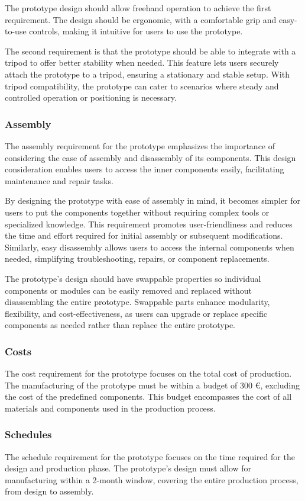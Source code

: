 The prototype design should allow freehand operation to achieve the first requirement. The design should be ergonomic, with a comfortable grip and easy-to-use controls, making it intuitive for users to use the prototype.

The second requirement is that the prototype should be able to integrate with a tripod to offer better stability when needed. This feature lets users securely attach the prototype to a tripod, ensuring a stationary and stable setup. With tripod compatibility, the prototype can cater to scenarios where steady and controlled operation or positioning is necessary.

\subsubsection{Assembly}
The assembly requirement for the prototype emphasizes the importance of considering the ease of assembly and disassembly of its components. This design consideration enables users to access the inner components easily, facilitating maintenance and repair tasks.

By designing the prototype with ease of assembly in mind, it becomes simpler for users to put the components together without requiring complex tools or specialized knowledge. This requirement promotes user-friendliness and reduces the time and effort required for initial assembly or subsequent modifications. Similarly, easy disassembly allows users to access the internal components when needed, simplifying troubleshooting, repairs, or component replacements.

The prototype's design should have swappable properties so individual components or modules can be easily removed and replaced without disassembling the entire prototype. Swappable parts enhance modularity, flexibility, and cost-effectiveness, as users can upgrade or replace specific components as needed rather than replace the entire prototype.

\subsubsection{Costs}
The cost requirement for the prototype focuses on the total cost of production. The manufacturing of the prototype must be within a budget of 300 €, excluding the cost of the predefined components. This budget encompasses the cost of all materials and components used in the production process.

\subsubsection{Schedules}
The schedule requirement for the prototype focuses on the time required for the design and production phase. The prototype's design must allow for manufacturing within a 2-month window, covering the entire production process, from design to assembly.

